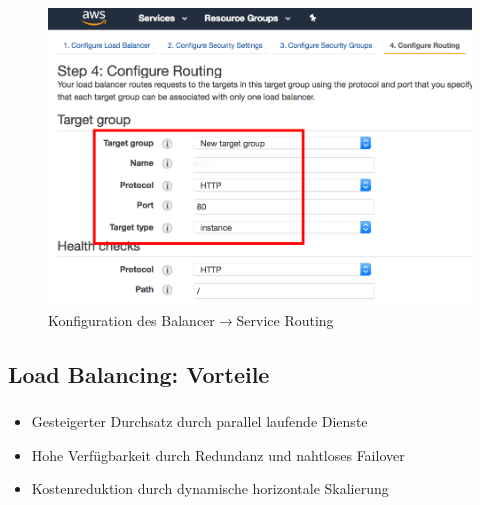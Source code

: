 \begin{frame}
    \frametitle{\insertsection}
    \framesubtitle{\insertsubsection}

	\vspace{-12pt} %
    \begin{figure}[h]
        \centering
        \includegraphics[height=0.65\textheight]{../images/aws-elb-routing}
        \caption{Konfiguration des Balancer$\rightarrow$Service Routing~\cite{bitnamiConfigureElastic}}
    \end{figure}
\end{frame}

\subsection{Load Balancing: Vorteile}
\begin{frame}
    \frametitle{\insertsection}
    \framesubtitle{\insertsubsection}

    \begin{itemize}
    	\item Gesteigerter Durchsatz durch parallel laufende Dienste
    	\item Hohe Verfügbarkeit durch Redundanz und nahtloses Failover
    	\item Kostenreduktion durch dynamische horizontale Skalierung
    \end{itemize}
\end{frame}

